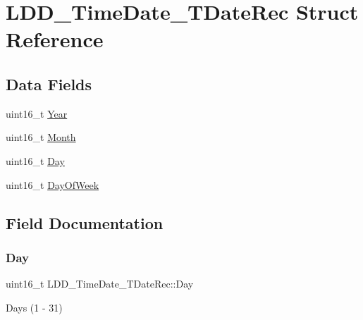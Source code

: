 \hypertarget{struct_l_d_d___time_date___t_date_rec}{}\section{L\+D\+D\+\_\+\+Time\+Date\+\_\+\+T\+Date\+Rec Struct Reference}
\label{struct_l_d_d___time_date___t_date_rec}
\subsection*{Data Fields}
\begin{DoxyCompactItemize}
\item 
uint16\+\_\+t \hyperlink{struct_l_d_d___time_date___t_date_rec_a58eee644efb4f46adc3437063c7bc194}{Year}
\item 
uint16\+\_\+t \hyperlink{struct_l_d_d___time_date___t_date_rec_a28aaeffe98b07d60db379d12269fa822}{Month}
\item 
uint16\+\_\+t \hyperlink{struct_l_d_d___time_date___t_date_rec_a6f1463c1917d6fe55a492bdb85a6bd17}{Day}
\item 
uint16\+\_\+t \hyperlink{struct_l_d_d___time_date___t_date_rec_a11ed8bc2e3fbd80252a7d4802d316f1c}{Day\+Of\+Week}
\end{DoxyCompactItemize}


\subsection{Field Documentation}
\mbox{\label{struct_l_d_d___time_date___t_date_rec_a6f1463c1917d6fe55a492bdb85a6bd17}} 
\subsubsection{\texorpdfstring{Day}{Day}}
{\footnotesize\ttfamily uint16\+\_\+t L\+D\+D\+\_\+\+Time\+Date\+\_\+\+T\+Date\+Rec\+::\+Day}

Days (1 -\/ 31) \mbox{\label{struct_l_d_d___time_date___t_date_rec_a11ed8bc2e3fbd80252a7d4802d316f1c}} 
